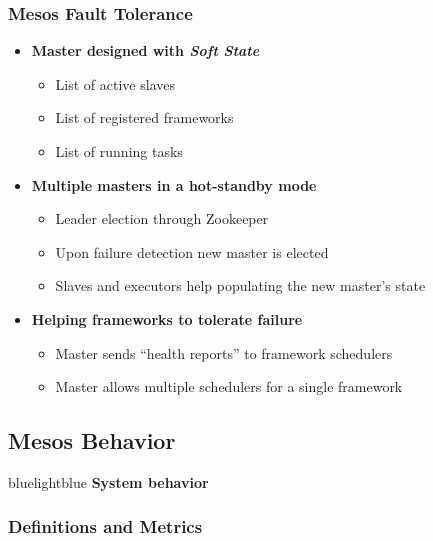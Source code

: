 \begin{frame}
\frametitle{Mesos Fault Tolerance}
\begin{itemize}
	\item {\bf Master designed with {\it Soft State}}
	\begin{itemize}
		\item List of active slaves
		\item List of registered frameworks
		\item List of running tasks
	\end{itemize}
	\item {\bf Multiple masters in a hot-standby mode}
	\begin{itemize}
		\item Leader election through Zookeeper
		\item Upon failure detection new master is elected
		\item Slaves and executors help populating the new master's state
	\end{itemize}
	\item {\bf Helping frameworks to tolerate failure}
	\begin{itemize}
		\item Master sends ``health reports'' to framework schedulers
		\item Master allows multiple schedulers for a single framework
	\end{itemize}
\end{itemize}
\end{frame}

\subsection{Mesos Behavior}
\begin{frame}
 \begin{colorblock}{blue}{lightblue}{ }
    \Large \textbf{System behavior}
  \end{colorblock}
\end{frame}


\begin{frame}
\frametitle{Definitions and Metrics}
\end{frame}
